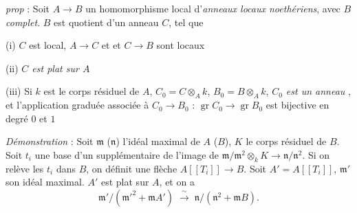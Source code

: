 \documentclass[11pt,a4paper]{article}
\begin{document}
\emph{prop} : Soit $A \to B$ un homomorphisme local d'\emph{anneaux locaux
noethériens}, avec \emph{$B$ complet}. $B$ est quotient d'un anneau $C$, tel
que

(i) $C$ est local, $A \to C$ et et $C \to B$ sont locaux

(ii) \emph{$C$ est plat sur $A$}

(iii) Si $k$ est le corps résiduel de $A$, $C_0 = C \otimes_A k$,
$B_0 = B \otimes_A k$, \emph{$C_0$ est un anneau }
, et l'application
graduée associée à $C_0 \to B_0$ : $\operatorname{gr} C_0 \to \operatorname{gr} B_0$
est bijective en degré $0$ et $1$

\emph{Démonstration} : Soit $\mathfrak{m}$ ($\mathfrak{n}$) l'idéal maximal
de $A$ ($B$), $K$ le corps résiduel de $B$. Soit $t_i$ une base d'un
supplémentaire de l'image de $\mathfrak{m}/\mathfrak{m}^2 \otimes_k K \to
\mathfrak{n}/\mathfrak{n}^2$. Si on relève les $t_i$ dans $B$, on définit une
flèche $A[[T_i]] \to B$. Soit $A' = A[[T_i]]$, $\mathfrak{m}'$ son idéal
maximal. $A'$ est plat sur $A$, et on a \struck{\ill{}}
\[
  \mathfrak{m}' / (\mathfrak{m}'^2 + \mathfrak{m} A')
  \;\xrightarrow{\ \sim\ }\;
  \mathfrak{n} / (\mathfrak{n}^2 + \mathfrak{m} B) .
\]
\end{document}
